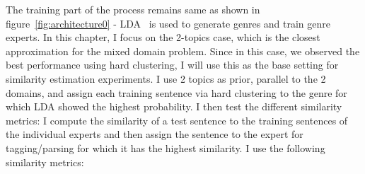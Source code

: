 


The training part of the process remains same as shown in figure~\ref{fig:architecture0} - LDA~\cite{Blei:2003:LDA:944919.944937,Blei:2012:PTM:2133806.2133826} is used to generate genres and train genre experts. In this chapter, I focus on the 2-topics case, which is the closest approximation for the mixed domain problem. Since in this case, we observed the best performance using hard clustering, I will use this as the base setting for similarity estimation experiments. 
I use 2 topics as prior, parallel to the 2 domains, and assign each training sentence via hard clustering to the genre for which LDA showed the highest probability.%
I then test the different similarity metrics: I compute the similarity of a test sentence to the training sentences of the individual experts and then assign the sentence to the expert for tagging/parsing for which it has the highest similarity. I use the following similarity metrics:

